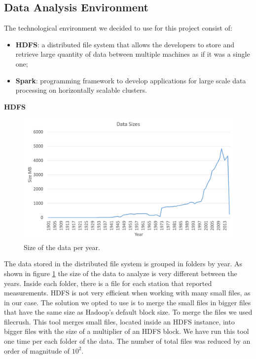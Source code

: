 \documentclass{vldb}
\begin{document}
\subsection{Data Analysis Environment}
The technological environment we decided to use for this project consist of:
\begin{itemize}
    \item \textbf{HDFS}\cite{hadoop}: a distributed file system that allows the developers to store and retrieve large quantity of data between multiple machines as if it was a single one;
    \item \textbf{Spark}\cite{spark}: programming framework to develop applications for large scale data processing on horizontally scalable clusters.
\end{itemize}

\textbf{HDFS}

\begin{figure}[tbh]
\includegraphics[width=1\linewidth]{dataSize}
\caption{Size of the data per year.}
\label{fig:dataSize}
\end{figure}

The data stored in the distributed file system is grouped in folders by year. As shown in figure \ref{fig:dataSize} the size of the data to analyze is very different between the years. Inside each folder, there is a file for each station that reported measurements. HDFS is not very efficient when working with many small files\cite{zhang2012improving}, as in our case. The solution we opted to use is to merge the small files in bigger files that have the same size as Hadoop's default block size. To merge the files we used filecrush\cite{filecrush}. This tool merges small files, located inside an HDFS instance, into bigger files with the size of a multiplier of an HDFS block. We have run this tool one time per each folder of the data. The number of total files was reduced by an order of magnitude of $10^2$.\\
\end{document}
